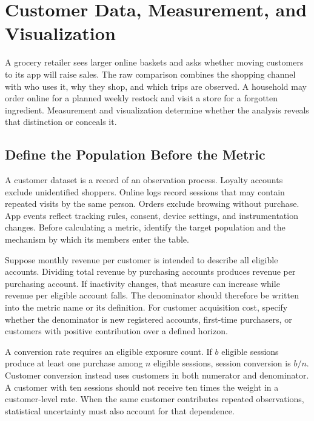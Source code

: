\hypertarget{M02-m2.-customer-data-measurement-and-visualization}{%
\chapter{Customer Data, Measurement, and
Visualization}\label{M02-m2.-customer-data-measurement-and-visualization}}

\noindent A grocery retailer sees larger online baskets and asks whether moving
customers to its app will raise sales. The raw comparison combines the
shopping channel with who uses it, why they shop, and which trips are
observed. A household may order online for a planned weekly restock and
visit a store for a forgotten ingredient. Measurement and visualization
determine whether the analysis reveals that distinction or conceals it.

\hypertarget{M02-define-the-population-before-the-metric}{%
\section{Define the Population Before the
Metric}\label{M02-define-the-population-before-the-metric}}

\noindent A customer dataset is a record of an observation process. Loyalty
accounts exclude unidentified shoppers. Online logs record sessions that
may contain repeated visits by the same person. Orders exclude browsing
without purchase. App events reflect tracking rules, consent, device
settings, and instrumentation changes. Before calculating a metric,
identify the target population and the mechanism by which its members
enter the table.

Suppose monthly revenue per customer is intended to describe all
eligible accounts. Dividing total revenue by purchasing accounts
produces revenue per purchasing account. If inactivity changes, that
measure can increase while revenue per eligible account falls. The
denominator should therefore be written into the metric name or its
definition. For customer acquisition cost, specify whether the
denominator is new registered accounts, first-time purchasers, or
customers with positive contribution over a defined horizon.

A conversion rate requires an eligible exposure count. If \(b\) eligible
sessions produce at least one purchase among \(n\) eligible sessions,
session conversion is \(b/n\). Customer conversion instead uses
customers in both numerator and denominator. A customer with ten
sessions should not receive ten times the weight in a customer-level
rate. When the same customer contributes repeated observations,
statistical uncertainty must also account for that dependence.

